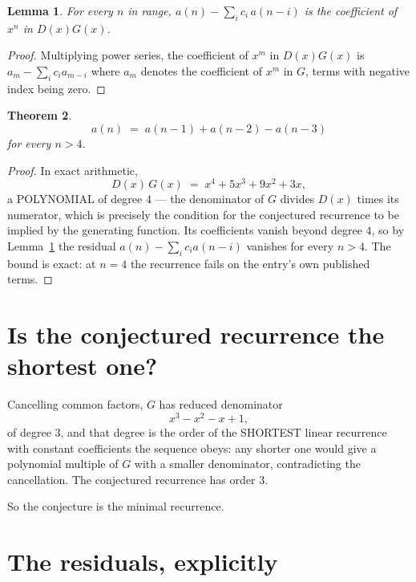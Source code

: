 \documentclass[11pt,a4paper]{article}
\theoremstyle{plain}
\newtheorem{theorem}{Theorem}
\newtheorem{lemma}[theorem]{Lemma}
\theoremstyle{definition}
\begin{document}
\begin{lemma}\label{lem:key}
For every $n$ in range, $a(n)-\sum_i c_i\,a(n-i)$ is the coefficient of $x^{n}$ in
$D(x)G(x)$.
\end{lemma}

\begin{proof}
Multiplying power series, the coefficient of $x^{m}$ in $D(x)G(x)$ is
$a_m-\sum_i c_i a_{m-i}$ where $a_m$ denotes the coefficient of $x^{m}$ in $G$, terms with
negative index being zero.
\end{proof}

\begin{theorem}
\[
a(n)\;=\;a(n-1) + a(n-2) - a(n-3)
\]
for every $n>4$.
\end{theorem}

\begin{proof}
In exact arithmetic,
\[
D(x)\,G(x)\;=\;x^{4} + 5 x^{3} + 9 x^{2} + 3 x,
\]
a POLYNOMIAL of degree $4$ --- the denominator of $G$ divides $D(x)$ times its numerator,
which is precisely the condition for the conjectured recurrence to be implied by the
generating function. Its coefficients vanish beyond degree $4$, so by
Lemma~\ref{lem:key} the residual $a(n)-\sum_ic_ia(n-i)$ vanishes for every
$n>4$. The bound is exact: at $n=4$ the recurrence fails on the entry's own published terms.
\end{proof}

\section{Is the conjectured recurrence the shortest one?}

Cancelling common factors, $G$ has reduced denominator
\[
x^{3} - x^{2} - x + 1,
\]
of degree $3$, and that degree is the order of the SHORTEST linear recurrence with
constant coefficients the sequence obeys: any shorter one would give a polynomial multiple of
$G$ with a smaller denominator, contradicting the cancellation. The conjectured recurrence has
order $3$.

So the conjecture is the minimal recurrence.

\section{The residuals, explicitly}
\end{document}

